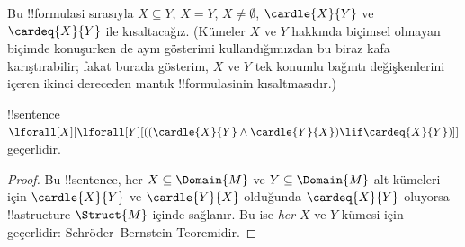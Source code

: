 Bu !!{formula}s{}i sırasıyla $X\subseteq Y$, $X=Y$, $X\neq\emptyset$,
$\cardle{X}{Y}$ ve $\cardeq{X}{Y}$ ile kısaltacağız. (Kümeler $X$ ve $Y$
hakkında biçimsel olmayan biçimde konuşurken de aynı gösterimi kullandığımızdan
bu biraz kafa karıştırabilir; fakat burada gösterim, $X$ ve $Y$ tek konumlu
bağıntı değişkenlerini içeren ikinci dereceden mantık !!{formula}s{}inin
kısaltmasıdır.)

\begin{prop}
!!{sentence} $\lforall[X][\lforall[Y][((\cardle{X}{Y} \land
    \cardle{Y}{X}) \lif \cardeq{X}{Y})]]$ geçerlidir.
\end{prop}

\begin{proof}
Bu !!{sentence}, her $X\subseteq\Domain{M}$ ve $Y\subseteq\Domain{M}$ alt
kümeleri için $\cardle{X}{Y}$ ve $\cardle{Y}{X}$ olduğunda
$\cardeq{X}{Y}$ oluyorsa !!a{structure} $\Struct{M}$ içinde sağlanır. Bu
ise \emph{her} $X$ ve $Y$ kümesi için geçerlidir: Schröder--Bernstein
Teoremidir.
\end{proof}


